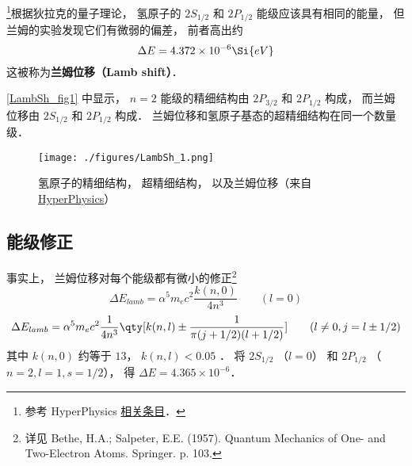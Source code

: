 

\footnote{参考 HyperPhysics \href{http://hyperphysics.phy-astr.gsu.edu/hbase/quantum/lamb.html}{相关条目}．}根据狄拉克的量子理论， 氢原子的 $2S_{1/2}$ 和 $2P_{1/2}$ 能级应该具有相同的能量， 但兰姆的实验发现它们有微弱的偏差， 前者高出约
\begin{equation}
\Delta E = 4.372\times 10^{-6} \Si{eV}
\end{equation}
这被称为\textbf{兰姆位移（Lamb shift）}．

\autoref{LambSh_fig1} 中显示， $n=2$ 能级的精细结构由 $2P_{3/2}$ 和 $2P_{1/2}$ 构成， 而兰姆位移由 $2S_{1/2}$ 和 $2P_{1/2}$ 构成． 兰姆位移和氢原子基态的超精细结构在同一个数量级． 
\begin{figure}[ht]
\centering
\texttt{[image: ./figures/LambSh\_1.png]}
\caption{氢原子的精细结构， 超精细结构， 以及兰姆位移（来自 \href{http://hyperphysics.phy-astr.gsu.edu/hbase/quantum/lamb.html}{HyperPhysics}）} \label{LambSh_fig1}
\end{figure}

\subsection{能级修正}
事实上， 兰姆位移对每个能级都有微小的修正\footnote{详见 Bethe, H.A.; Salpeter, E.E. (1957). Quantum Mechanics of One- and Two-Electron Atoms. Springer. p. 103.}
\begin{equation}
\Delta E_{lamb} = \alpha^5 m_e c^2 \frac{k(n, 0)}{4n^3} \qquad (l = 0)
\end{equation}
\begin{equation}
\Delta E_{lamb} =\alpha^5 m_e c^2 \frac{1}{4n^3} \qty[k(n,l) \pm \frac{1}{\pi(j+1/2)(l+1/2)} ] \qquad (l \ne 0, j = l \pm 1/2)
\end{equation}
其中 $k(n, 0)$ 约等于 $13$， $k(n, l) < 0.05$ ． 将 $2S_{1/2}$ （$l = 0$） 和 $2P_{1/2}$ （$n = 2, l = 1, s = 1/2$）， 得 $\Delta E = 4.365\times 10^{-6}$．
